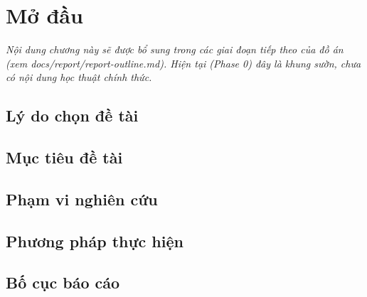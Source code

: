 \chapter*{Mở đầu}

\textit{Nội dung chương này sẽ được bổ sung trong các giai đoạn tiếp theo của đồ án (xem docs/report/report-outline.md). Hiện tại (Phase 0) đây là khung sườn, chưa có nội dung học thuật chính thức.}

\section*{Lý do chọn đề tài}

\section*{Mục tiêu đề tài}

\section*{Phạm vi nghiên cứu}

\section*{Phương pháp thực hiện}

\section*{Bố cục báo cáo}
